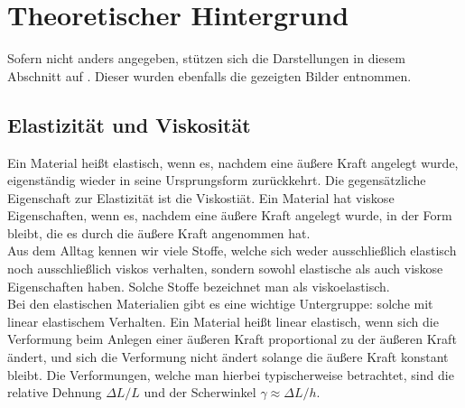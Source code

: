\documentclass[11pt,a4paper,oneside]{scrartcl}
\begin{document}
\section{Theoretischer Hintergrund}
Sofern nicht anders angegeben, stützen sich die Darstellungen in diesem Abschnitt auf \cite{versuchsanleitung}. Dieser wurden ebenfalls die gezeigten Bilder entnommen.
\subsection{Elastizität und Viskosität}\label{elas_u_vis}
Ein Material heißt elastisch, wenn es, nachdem eine äußere Kraft angelegt wurde, eigenständig wieder in seine Ursprungsform zurückkehrt. Die gegensätzliche Eigenschaft zur Elastizität ist die Viskostiät. Ein Material hat viskose Eigenschaften, wenn es, nachdem eine äußere Kraft angelegt wurde, in der Form bleibt, die es durch die äußere Kraft angenommen hat. \\ Aus dem Alltag kennen wir viele Stoffe, welche sich weder ausschließlich elastisch noch ausschließlich viskos verhalten, sondern sowohl elastische als auch viskose Eigenschaften haben. Solche Stoffe bezeichnet man als viskoelastisch. \\
Bei den elastischen Materialien gibt es eine wichtige Untergruppe: solche mit linear elastischem Verhalten. Ein Material heißt linear elastisch, wenn sich die Verformung beim Anlegen einer äußeren
Kraft proportional zu der äußeren Kraft ändert, und sich die Verformung nicht ändert solange die äußere Kraft konstant bleibt. Die Verformungen, welche man hierbei typischerweise betrachtet, sind die relative
Dehnung $\Delta L / L$ und der Scherwinkel $\gamma \approx \Delta L/ h$. 
\end{document}
